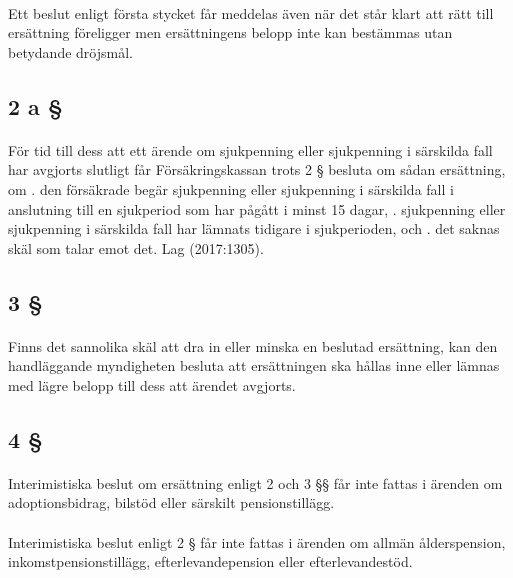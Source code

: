\documentclass[a4paper,notitlepage,openany,10pt]{book}
\begin{document}
\paragraph*{}
Ett beslut enligt första stycket får meddelas även när det står klart att rätt till ersättning föreligger men ersättningens belopp inte kan bestämmas utan betydande dröjsmål.
\subsection*{2 a §}
\paragraph*{}
För tid till dess att ett ärende om sjukpenning eller sjukpenning i särskilda fall har avgjorts slutligt får Försäkringskassan trots 2 § besluta om sådan ersättning, om
. den försäkrade begär sjukpenning eller sjukpenning i särskilda fall i anslutning till en sjukperiod som har pågått i minst 15 dagar,
. sjukpenning eller sjukpenning i särskilda fall har lämnats tidigare i sjukperioden, och
. det saknas skäl som talar emot det.
Lag (2017:1305).
\subsection*{3 §}
\paragraph*{}
Finns det sannolika skäl att dra in eller minska en beslutad ersättning, kan den handläggande myndigheten besluta att ersättningen ska hållas inne eller lämnas med lägre belopp till dess att ärendet avgjorts.
\subsection*{4 §}
\paragraph*{}
Interimistiska beslut om ersättning enligt 2 och 3 §§ får inte fattas i ärenden om adoptionsbidrag, bilstöd eller särskilt pensionstillägg.
\paragraph*{}
Interimistiska beslut enligt 2 § får inte fattas i ärenden om allmän ålderspension, inkomstpensionstillägg, efterlevandepension eller efterlevandestöd.
\end{document}
